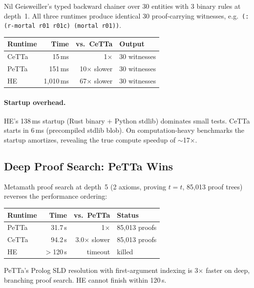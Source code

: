 \documentclass[11pt]{article}
\newcommand{\code}[1]{\texttt{#1}}
\newcommand{\PeTTa}{\textup{PeTTa}}
\newcommand{\HE}{\textup{HE}}
\newcommand{\CeTTa}{\textup{CeTTa}}
\begin{document}
Nil Geisweiller's typed backward chainer over 30 entities with 3 binary
rules at depth~1.  All three runtimes produce identical 30
proof-carrying witnesses, e.g.\
\code{(: (r-mortal r01 r01c) (mortal r01))}.

\begin{center}
\begin{tabular}{lrrl}
\toprule
Runtime & Time & vs.\ \CeTTa{} & Output \\
\midrule
\CeTTa{} & 15\,ms  & 1$\times$           & 30 witnesses \\
\PeTTa{} & 151\,ms & 10$\times$ slower    & 30 witnesses \\
\HE{}    & 1{,}010\,ms & 67$\times$ slower & 30 witnesses \\
\bottomrule
\end{tabular}
\end{center}

\paragraph{Startup overhead.}
\HE{}'s 138\,ms startup (Rust binary + Python stdlib) dominates small
tests.  \CeTTa{} starts in 6\,ms (precompiled stdlib blob).  On
computation-heavy benchmarks the startup amortizes, revealing the true
compute speedup of $\sim$17$\times$.

\subsection{Deep Proof Search: \PeTTa{} Wins}

Metamath proof search at depth~5 (2 axioms, proving $t = t$,
85{,}013 proof trees) reverses the performance ordering:

\begin{center}
\begin{tabular}{lrrl}
\toprule
Runtime & Time & vs.\ \PeTTa{} & Status \\
\midrule
\PeTTa{} & 31.7\,s  & 1$\times$          & 85{,}013 proofs \\
\CeTTa{} & 94.2\,s  & 3.0$\times$ slower & 85{,}013 proofs \\
\HE{}    & $>$120\,s & timeout            & killed \\
\bottomrule
\end{tabular}
\end{center}

\PeTTa{}'s Prolog SLD resolution with first-argument indexing is
3$\times$ faster on deep, branching proof search.  \HE{} cannot finish
within 120\,s.
\end{document}
